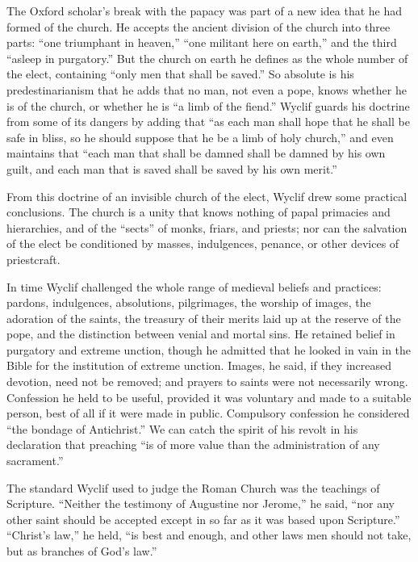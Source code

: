 The Oxford scholar’s break with the papacy was part of a new idea that he had formed of the church.
He accepts the ancient division of the church into three parts: “one triumphant in heaven,” “one
militant here on earth,” and the third “asleep in purgatory.” But the church on earth he defines as
the whole number of the elect, containing “only men that shall be saved.” So absolute is his
predestinarianism that he adds that no man, not even a pope, knows whether he is of the church, or
whether he is “a limb of the fiend.” Wyclif guards his doctrine from some of its dangers by adding
that “as each man shall hope that he shall be safe in bliss, so he should suppose that he be a limb
of holy church,” and even maintains that “each man that shall be damned shall be damned by his own
guilt, and each man that is saved shall be saved by his own merit.”

From this doctrine of an invisible church of the elect, Wyclif drew some practical conclusions. The
church is a unity that knows nothing of papal primacies and hierarchies, and of the “sects” of
monks, friars, and priests; nor can the salvation of the elect be conditioned by masses,
indulgences, penance, or other devices of priestcraft.

In time Wyclif challenged the whole range of medieval beliefs and practices: pardons, indulgences,
absolutions, pilgrimages, the worship of images, the adoration of the saints, the treasury of their
merits laid up at the reserve of the pope, and the distinction between venial and mortal sins. He
retained belief in purgatory and extreme unction, though he admitted that he looked in vain in the
Bible for the institution of extreme unction. Images, he said, if they increased devotion, need not
be removed; and prayers to saints were not necessarily wrong. Confession he held to be useful,
provided it was voluntary and made to a suitable person, best of all if it were made in public.
Compulsory confession he considered “the bondage of Antichrist.” We can catch the spirit of his
revolt in his declaration that preaching “is of more value than the administration of any
sacrament.”

The standard Wyclif used to judge the Roman Church was the teachings of Scripture. “Neither the
testimony of Augustine nor Jerome,” he said, “nor any other saint should be accepted except in so
far as it was based upon Scripture.” “Christ’s law,” he held, “is best and enough, and other laws
men should not take, but as branches of God’s law.”


